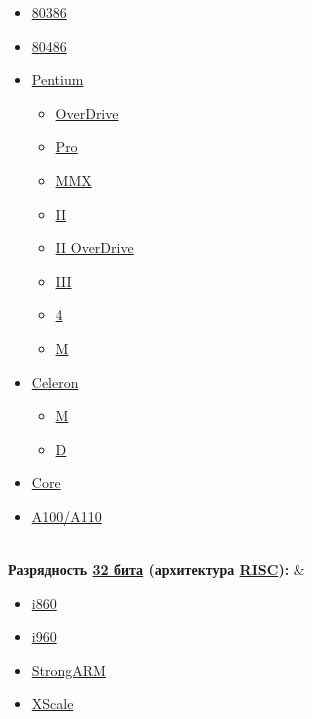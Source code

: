 \documentclass[a4paper,11pt]{article}
\begin{document}
\begin{tabular}
\begin{tabular}
\begin{tabular}
\begin{itemize}
	\item \href{https://ru.wikipedia.org/wiki/80386}{80386}
	\item \href{https://ru.wikipedia.org/wiki/80486}{80486}
	\item \href{https://ru.wikipedia.org/wiki/Pentium}{Pentium}
\begin{itemize}
	\item \href{https://ru.wikipedia.org/wiki/Pentium_OverDrive}{OverDrive}
	\item \href{https://ru.wikipedia.org/wiki/Pentium_Pro}{Pro}
	\item \href{https://ru.wikipedia.org/wiki/Pentium_MMX}{MMX}
	\item \href{https://ru.wikipedia.org/wiki/Pentium_II}{II}
	\item \href{https://ru.wikipedia.org/wiki/Pentium_II_OverDrive}{II OverDrive}
	\item \href{https://ru.wikipedia.org/wiki/Pentium_III}{III}
	\item \href{https://ru.wikipedia.org/wiki/Pentium_4}{4}
	\item \href{https://ru.wikipedia.org/wiki/Pentium_M}{M}
\end{itemize}
	\item \href{https://ru.wikipedia.org/wiki/Celeron}{Celeron}
\begin{itemize}
	\item \href{https://ru.wikipedia.org/wiki/Celeron_M}{M}
	\item \href{https://ru.wikipedia.org/wiki/Celeron_D}{D}
\end{itemize}
	\item \href{https://ru.wikipedia.org/wiki/Core}{Core}
	\item \href{https://ru.wikipedia.org/wiki/Intel_A100}{A100/A110}
\end{itemize} \\ 
\textbf{Разрядность \href{https://ru.wikipedia.org/wiki/32_%D0%B1%D0%B8%D1%82%D0%B0}{32 бита} (архитектура \href{https://ru.wikipedia.org/wiki/RISC}{RISC}):} & 
\begin{itemize}
	\item \href{https://ru.wikipedia.org/wiki/I860}{i860}
	\item \href{https://ru.wikipedia.org/wiki/I960}{i960}
	\item \href{https://ru.wikipedia.org/wiki/StrongARM}{StrongARM}
	\item \href{https://ru.wikipedia.org/wiki/XScale}{XScale}

\end{itemize}
\end{tabular}
\end{tabular}
\end{tabular}
\end{document}
